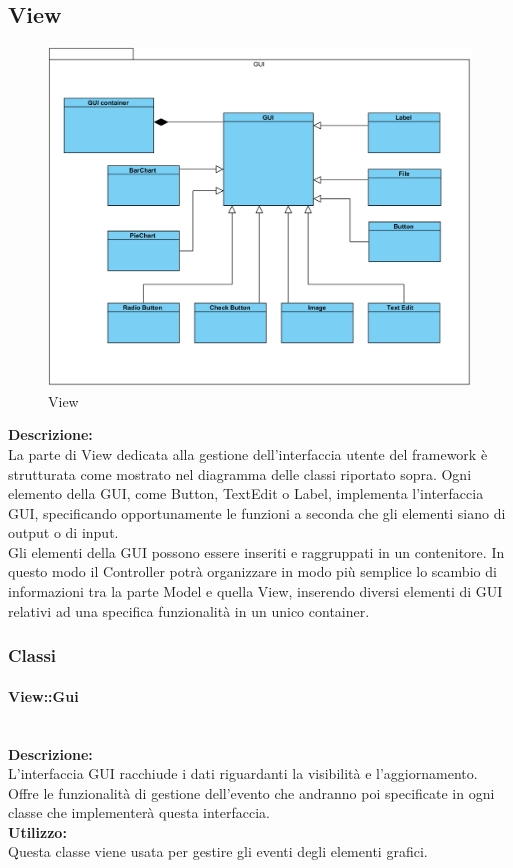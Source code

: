\begin{samepage}
\subsection{View}
\nopagebreak
\begin{figure}[H]
	\centering
	\includegraphics[width=14cm]{diagrammi_img/classi_e_package/gui_classes.png}
	\caption{View}
\end{figure}
\end{samepage}
\textbf{Descrizione:}\\
La parte di View dedicata alla gestione dell'interfaccia utente del framework è strutturata come mostrato nel diagramma delle classi riportato sopra.
Ogni elemento della GUI, come Button, TextEdit o Label, implementa l'interfaccia GUI, specificando opportunamente le funzioni a seconda che gli elementi siano di output o di input.\\
Gli elementi della GUI possono essere inseriti e raggruppati in un contenitore. In questo modo il Controller potrà organizzare in modo più semplice lo scambio di informazioni tra la parte Model e quella View, inserendo diversi elementi di GUI relativi ad una specifica funzionalità in un unico container.

\subsubsection{Classi}

\paragraph{View\-::Gui}\label{gui}\mbox{}\\
\textbf{Descrizione:}\\
L'interfaccia GUI racchiude i dati riguardanti la visibilità e l'aggiornamento. Offre le funzionalità di gestione dell'evento che andranno poi specificate in ogni classe che implementerà questa interfaccia.\\
\textbf{Utilizzo:}\\
Questa classe viene usata per gestire gli eventi degli elementi grafici.

